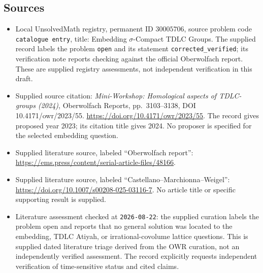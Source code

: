 \documentclass[11pt]{article}
\begin{document}
\subsection{Sources}
\begin{itemize}
\item Local UnsolvedMath registry, permanent ID \(30005706\), source problem code \texttt{catalogue entry}, title: Embedding \(\sigma\)-Compact TDLC Groups. The supplied record labels the problem \texttt{open} and its statement \texttt{corrected\_verified}; its verification note reports checking against the official Oberwolfach report. These are supplied registry assessments, not independent verification in this draft.
\item Supplied source citation: \emph{Mini-Workshop: Homological aspects of TDLC-groups (2024)}, Oberwolfach Reports, pp.\ 3103--3138, DOI 10.4171/owr/2023/55. \url{https://doi.org/10.4171/owr/2023/55}. The record gives proposed year 2023; its citation title gives 2024. No proposer is specified for the selected embedding question.
\item Supplied literature source, labeled ``Oberwolfach report'': \url{https://ems.press/content/serial-article-files/48166}.
\item Supplied literature source, labeled ``Castellano--Marchionna--Weigel'': \url{https://doi.org/10.1007/s00208-025-03116-7}. No article title or specific supporting result is supplied.
\item Literature assessment checked at \texttt{2026-08-22}: the supplied curation labels the problem open and reports that no general solution was located to the embedding, TDLC Atiyah, or irrational-covolume lattice questions. This is supplied dated literature triage derived from the OWR curation, not an independently verified assessment. The record explicitly requests independent verification of time-sensitive status and cited claims.
\end{itemize}
\end{document}
